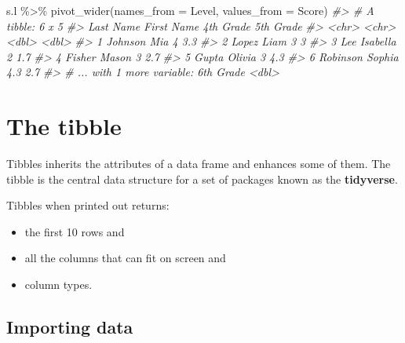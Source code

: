 \documentclass[
]{book}
\newenvironment{Shaded}{\begin{snugshade}}{\end{snugshade}}
\newcommand{\AttributeTok}[1]{\textcolor[rgb]{0.77,0.63,0.00}{#1}}
\newcommand{\CommentTok}[1]{\textcolor[rgb]{0.56,0.35,0.01}{\textit{#1}}}
\newcommand{\FunctionTok}[1]{\textcolor[rgb]{0.00,0.00,0.00}{#1}}
\newcommand{\NormalTok}[1]{#1}
\newcommand{\SpecialCharTok}[1]{\textcolor[rgb]{0.00,0.00,0.00}{#1}}
\providecommand{\tightlist}{%
  \setlength{\itemsep}{0pt}\setlength{\parskip}{0pt}}
\begin{document}
\begin{Shaded}
\begin{Highlighting}[]
\NormalTok{s.l }\SpecialCharTok{\%\textgreater{}\%} 
  \FunctionTok{pivot\_wider}\NormalTok{(}\AttributeTok{names\_from =}\NormalTok{ Level, }\AttributeTok{values\_from =}\NormalTok{ Score)}
\CommentTok{\#\textgreater{} \# A tibble: 6 x 5}
\CommentTok{\#\textgreater{}   \textasciigrave{}Last Name\textasciigrave{} \textasciigrave{}First Name\textasciigrave{} \textasciigrave{}4th Grade\textasciigrave{} \textasciigrave{}5th Grade\textasciigrave{}}
\CommentTok{\#\textgreater{}   \textless{}chr\textgreater{}       \textless{}chr\textgreater{}              \textless{}dbl\textgreater{}       \textless{}dbl\textgreater{}}
\CommentTok{\#\textgreater{} 1 Johnson     Mia                  4           3.3}
\CommentTok{\#\textgreater{} 2 Lopez       Liam                 3           3  }
\CommentTok{\#\textgreater{} 3 Lee         Isabella             2           1.7}
\CommentTok{\#\textgreater{} 4 Fisher      Mason                3           2.7}
\CommentTok{\#\textgreater{} 5 Gupta       Olivia               3           4.3}
\CommentTok{\#\textgreater{} 6 Robinson    Sophia               4.3         2.7}
\CommentTok{\#\textgreater{} \# ... with 1 more variable: 6th Grade \textless{}dbl\textgreater{}}
\end{Highlighting}
\end{Shaded}

\hypertarget{the-tibble}{%
\section{The tibble}\label{the-tibble}}

Tibbles inherits the attributes of a data frame and enhances some of them. The tibble is the central data structure for a set of packages known as the \textbf{tidyverse}.

Tibbles when printed out returns:

\begin{itemize}
\tightlist
\item
  the first 10 rows and
\item
  all the columns that can fit on screen and
\item
  column types.
\end{itemize}

\hypertarget{tr-import}{%
\subsection{Importing data}\label{tr-import}}
\end{document}
